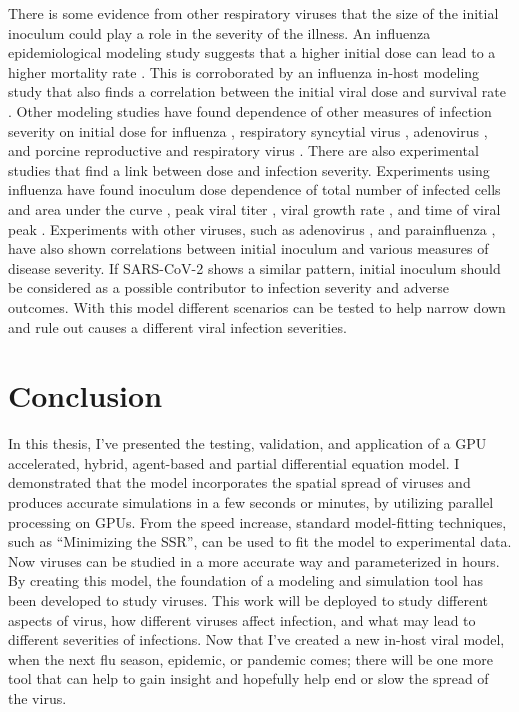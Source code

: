 There is some evidence from other respiratory viruses that the size of the initial inoculum could play a role in the severity of the illness. An influenza epidemiological modeling study suggests that a higher initial dose can lead to a higher mortality rate \citep{paulo10}. This is corroborated by an influenza in-host modeling study that also finds a correlation between the initial viral dose and survival rate \citep{price15}. Other modeling studies have found dependence of other measures of infection severity on initial dose for influenza \citep{moore20}, respiratory syncytial virus \citep{wethington19}, adenovirus \citep{li14}, and porcine reproductive and respiratory virus \citep{go19}. There are also experimental studies that find a link between dose and infection severity. Experiments using influenza have found inoculum dose dependence of total number of infected cells and area under the curve \citep{manicassamy10}, peak viral titer \citep{ginsberg52,iida63,ottolini05}, viral growth rate \citep{ginsberg52}, and time of viral peak \citep{iida63,ginsberg52}. Experiments with other viruses, such as adenovirus \citep{prince93}, and parainfluenza \citep{ottolini96}, have also shown correlations between initial inoculum and various measures of disease severity. If SARS-CoV-2 shows a similar pattern, initial inoculum should be considered as a possible contributor to infection severity and adverse outcomes. With this model different scenarios can be tested to help narrow down and rule out causes a different viral infection severities. 

\section{Conclusion}

In this thesis, I've presented the testing, validation, and application of a GPU accelerated, hybrid, agent-based and partial differential equation model. I demonstrated that the model incorporates the spatial spread of viruses and produces accurate simulations in a few seconds or minutes, by utilizing parallel processing on GPUs. From the speed increase, standard model-fitting techniques, such as ``Minimizing the SSR'', can be used to fit the model to experimental data. Now viruses can be studied in a more accurate way and parameterized in hours. By creating this model, the foundation of a modeling and simulation tool has been developed to study viruses. This work will be deployed to study different aspects of virus, how different viruses affect infection, and what may lead to different severities of infections. Now that I've created a new in-host viral model, when the next flu season, epidemic, or pandemic comes; there will be one more tool that can help to gain insight and hopefully help end or slow the spread of the virus.












